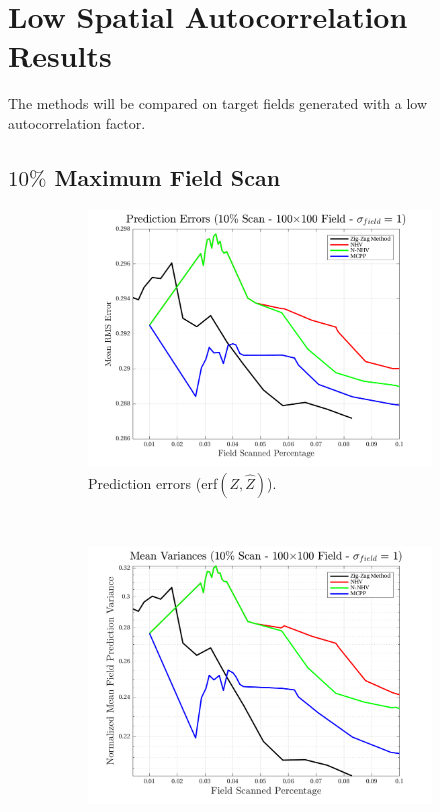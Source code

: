 
\section{Low Spatial Autocorrelation Results}
The methods will be compared on target fields generated with a low autocorrelation factor.

\clearpage
\subsection{$10\%$ Maximum Field Scan}
\begin{figure}[htb!]
    \centering
    \begin{subfigure}[t]{0.65\textwidth}
        \centering
        \includegraphics[width=\linewidth]{figures/hbresults/pred_errs_10p_100x100_sf_1_seed_2.png}
        \captionsetup{skip=0.20\baselineskip,size=footnotesize}
        \caption{Prediction errors (erf$(Z,\hat{Z})$).}
        \label{fig:prederrs_sigma1_p10_s2}
    \end{subfigure}%
    \\
    \begin{subfigure}[t]{0.65\textwidth}
        \centering
        \includegraphics[width=\linewidth]{figures/hbresults/vars_10p_100x100_sf_1_seed_2.png}

\end{subfigure}
\end{figure}
